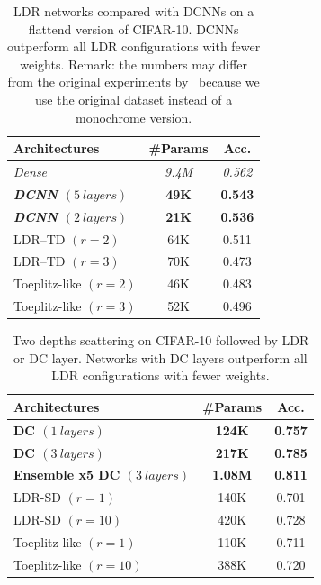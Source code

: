 \begin{table}[htb]
  \centering
  \begin{tabular}{lcc}
    \toprule
    \textbf{Architectures} & \textbf{\#Params} & \textbf{Acc.}  \\
    \midrule
    \textit{Dense} & \textit{9.4M}	& \textit{0.562} \\
    \textbf{\textit{DCNN $(5\ layers)$}} & \textbf{49K}	& \textbf{0.543} \\
    \textbf{\textit{DCNN $(2\ layers)$}} & \textbf{21K} & \textbf{0.536} \\
    LDR--TD	$(r = 2)$	        & 64K	& 0.511 \\
    LDR--TD	$(r = 3)$	        & 70K	& 0.473 \\
    Toeplitz-like $(r=2)$	    & 46K	& 0.483 \\
    Toeplitz-like $(r =3)$	    & 52K    & 0.496 \\
    \bottomrule
    \end{tabular}
    \caption{LDR networks compared with DCNNs on a flattend version of CIFAR-10. DCNNs outperform all LDR configurations with fewer weights. Remark: the numbers may differ from the original experiments by~\citet{Thomas_NIPS2018_8119} because we use the original dataset instead of a monochrome version.}
    \label{table:xp_ldr}
\end{table}

\begin{table}[htb]
  \centering
  \begin{tabular}{lcc}
    \toprule
    \textbf{Architectures} & \textbf{\#Params} & \textbf{Acc.}  \\
    \midrule
    \textbf{DC $(1\ layers)$} & \textbf{124K} & \textbf{0.757} \\
    \textbf{DC $(3\ layers)$} & \textbf{217K} & \textbf{0.785} \\
    \textbf{Ensemble x5 DC $(3\ layers)$} &  \textbf{1.08M} & \textbf{0.811} \\
    LDR-SD $(r=1)$ & 140K & 0.701 \\
    LDR-SD $(r=10)$ & 420K & 0.728 \\
    Toeplitz-like $(r=1)$ & 110K & 0.711 \\
    Toeplitz-like $(r=10)$ & 388K & 0.720 \\
    \bottomrule
    \end{tabular}
    \caption{Two depths scattering on CIFAR-10 followed by LDR or DC layer. Networks with DC layers outperform all LDR configurations with fewer weights.}
    \label{table:xp_ldr_scattering}
\end{table}


